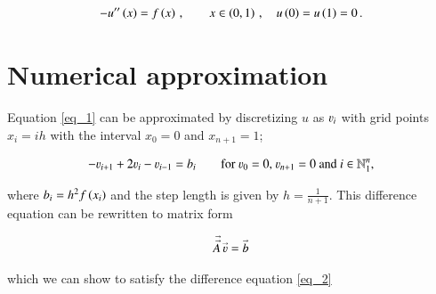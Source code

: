 \documentclass[11pt,english,a4paper]{article}
\begin{document}
\begin{flushleft}
\begin{align}
-u^{\prime\prime}\left({x}\right) = f\left({x}\right)\,,  \qquad x\in\left({0,1}\right)\,,\quad u\left({0}\right) = u\left({1}\right) = 0 \,.
\label{eq_1}
\end{align}

\section{Numerical approximation}

Equation \eqref{eq_1} can be approximated by discretizing $u$ as $\varv_i$ with grid points $x_i = i h$ with the interval $x_0 = 0$ and $x_{n+1}=1$;

\begin{align}
-\varv_{i+1} + 2 \varv_i - \varv_{i-1} = b_i \qquad \text{for $\varv_0 = 0$, $\varv_{n+1} = 0$ and $i\in\mathbb{N}_1^n$,}
\label{eq_2}
\end{align}

where $b_i = h^2 f\left({x_i}\right)$ and the step length is given by $h = \frac{1}{n+1}$. This difference equation can be rewritten to matrix form

\begin{align*}
\vec{\vec{A}}\,\vec{\varv} = \vec{b} 
\end{align*}

which we can show to satisfy the difference equation \eqref{eq_2}


\end{flushleft}
\end{document}
